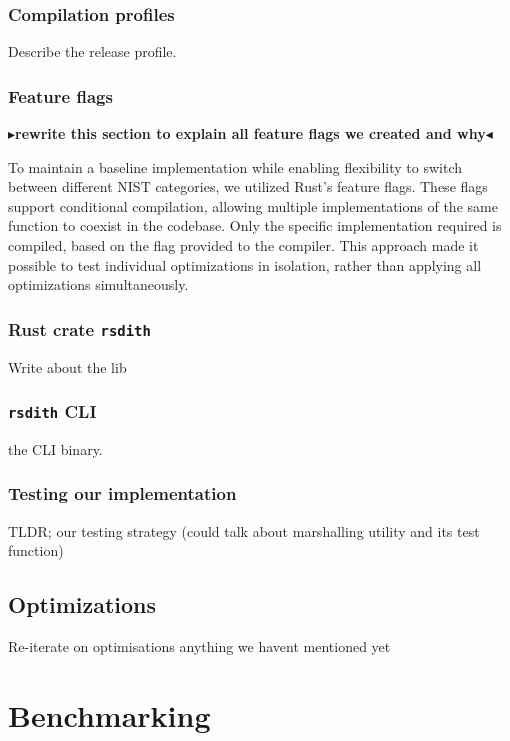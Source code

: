 \documentclass[11pt]{report}
\theoremstyle{definition}
\theoremstyle{plain}
\newcommand{\todo}[1]{{\color[rgb]{.5,0,0}\textbf{$\blacktriangleright$#1$\blacktriangleleft$}}}
\begin{document}
\subsection{Compilation profiles}

Describe the release profile.

\subsection{Feature flags}\label{sub:feature_flags}
\todo{rewrite this section to explain all feature flags we created and why}

To maintain a baseline implementation while enabling flexibility to switch between different NIST categories, we utilized Rust's feature flags. These flags support conditional compilation, allowing multiple implementations of the same function to coexist in the codebase. Only the specific implementation required is compiled, based on the flag provided to the compiler. This approach made it possible to test individual optimizations in isolation, rather than applying all optimizations simultaneously.

\subsection{Rust crate \texttt{rsdith}}

Write about the lib

\subsection{\texttt{rsdith} CLI}

the CLI binary.

\subsection{Testing our implementation}\label{sub:testing_our_implementation}

TLDR; our testing strategy (could talk about marshalling utility and its test function)

\section{Optimizations}

Re-iterate on optimisations anything we havent mentioned yet

\chapter{Benchmarking}\label{ch:bench}
\end{document}
